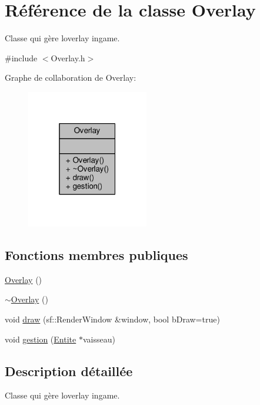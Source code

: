 \hypertarget{class_overlay}{}\section{Référence de la classe Overlay}
\label{class_overlay}


Classe qui gère l\textquotesingle{}overlay ingame.  




{\ttfamily \#include $<$Overlay.\+h$>$}



Graphe de collaboration de Overlay\+:\nopagebreak
\begin{figure}[H]
\begin{center}
\leavevmode
\includegraphics[width=151pt]{class_overlay__coll__graph}
\end{center}
\end{figure}
\subsection*{Fonctions membres publiques}
\begin{DoxyCompactItemize}
\item 
\hyperlink{class_overlay_ab4f509d502931bcaad03418470993d70}{Overlay} ()
\item 
\hyperlink{class_overlay_ad40a5e109ee4acbdec9f21d5496b7fa9}{$\sim$\+Overlay} ()
\item 
void \hyperlink{class_overlay_a3fcdcd87bc909289e094ce799708a0c9}{draw} (sf\+::\+Render\+Window \&window, bool b\+Draw=true)
\item 
void \hyperlink{class_overlay_a4a0fd28b3355bcaeb54d24641a1066e3}{gestion} (\hyperlink{class_entite}{Entite} $\ast$vaisseau)
\end{DoxyCompactItemize}


\subsection{Description détaillée}
Classe qui gère l\textquotesingle{}overlay ingame. 

